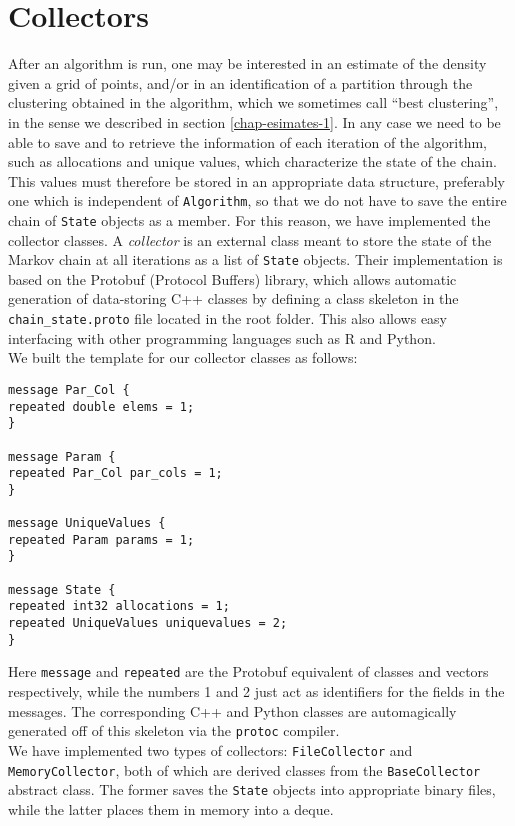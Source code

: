\section{Collectors}\label{collectors}
After an algorithm is run, one may be interested in an estimate of the density given a grid of points, and/or in an identification of a partition through the clustering obtained in the algorithm, which we sometimes call ``best clustering'', in the sense we described in section \ref{chap-esimates-1}.
In any case we need to be able to save and to retrieve the information of each iteration of the algorithm, such as allocations and unique values, which characterize the state of the chain.
This values must therefore be stored in an appropriate data structure, preferably one which is independent of \verb|Algorithm|, so that we do not have to save the entire chain of \verb|State| objects as a member.
For this reason, we have implemented the collector classes.
A \emph{collector} is an external class meant to store the state of the Markov chain at all iterations as a list of \verb|State| objects.
Their implementation is based on the Protobuf (Protocol Buffers) library, which allows automatic generation of data-storing C++ classes by defining a class skeleton in the \verb|chain_state.proto| file located in the root folder.
This also allows easy interfacing with other programming languages such as R and Python. \\
We built the template for our collector classes as follows:
\begin{verbatim}
message Par_Col {
repeated double elems = 1;
}

message Param {
repeated Par_Col par_cols = 1;
}

message UniqueValues {
repeated Param params = 1;
}

message State {
repeated int32 allocations = 1;
repeated UniqueValues uniquevalues = 2;
}
\end{verbatim}
Here \verb|message| and \verb|repeated| are the Protobuf equivalent of classes and vectors respectively, while the numbers 1 and 2 just act as identifiers for the fields in the messages.
The corresponding C++ and Python classes are automagically generated off of this skeleton via the \verb|protoc| compiler. \\
We have implemented two types of collectors: \verb|FileCollector| and \verb|MemoryCollector|, both of which are derived classes from the \verb|BaseCollector| abstract class.
The former saves the \verb|State| objects into appropriate binary files, while the latter places them in memory into a deque.
